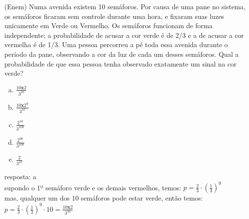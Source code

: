 \begin{ex}
(Enem) Numa avenida existem 10 semáforos. Por causa de uma pane no sistema, os semáforos ficaram sem controle durante uma hora, e fixaram suas luzes unicamente em Verde ou Vermelho. Os semáforos funcionam de forma independente; a probabilidade de acusar a cor verde é de 2/3 e a de acusar a cor vermelha é de 1/3. Uma pessoa percorreu a pé toda essa avenida durante o período da pane, observando a cor da luz de cada um desses semáforos. Qual a probabilidade de que essa pessoa tenha observado exatamente um sinal na cor verde?
  \begin{enumerate} [(a)]
      \item $\frac{10\textbf{x}2}{3^{10}}$
      \item $\frac{10\textbf{x}2^9}{3^{10}}$
      \item $\frac{2^{10}}{3^{100}}$
      \item $\frac{2^{90}}{3^{100}}$
      \item $\frac{2}{3^{10}}$
  \end{enumerate}
   \begin{sol}
    resposta: a \\
    supondo o 1º semáforo verde e os demais vermelhos, temos:\hspace{0,1cm} $p=\frac{2}{3}\cdot(\frac{1}{3})^9$\\
    mas, qualquer um dos 10 semáforos pode estar verde, então temos: \hspace{0,2cm} $p=\frac{2}{3}\cdot(\frac{1}{3})^9\cdot10= \frac{10\textbf{x}2}{3^{10}}$
   \end{sol}
  \end{ex}